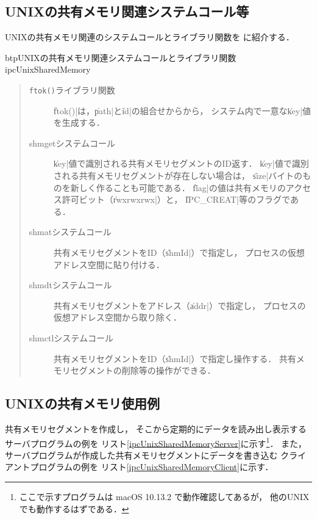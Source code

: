 \subsection{UNIXの共有メモリ関連システムコール等}
UNIXの共有メモリ関連のシステムコールとライブラリ関数を
に紹介する．

\begin{myfig}{btp}{UNIXの共有メモリ関連システムコールとライブラリ関数}
  {ipcUnixSharedMemory}
  
\end{myfig}

\begin{quote}
  \begin{description}
  \item [\texttt{ftok()}ライブラリ関数]
    \|ftok()|は，\|path|と\|id|の組合せからから，
    システム内で一意な\|key|値を生成する．

  \item [shmgetシステムコール]
    \|key|値で識別される共有メモリセグメントのID返す．
    \|key|値で識別される共有メモリセグメントが存在しない場合は，
    \|size|バイトのものを新しく作ることも可能である．
    \|flag|の値は共有メモリのアクセス許可ビット（\|rwxrwxrwx|）と，
    \|IPC_CREAT|等のフラグである．

  \item [shmatシステムコール]
    共有メモリセグメントをID（\|shmId|）で指定し，
    プロセスの仮想アドレス空間に貼り付ける．

  \item [shmdtシステムコール]
    共有メモリセグメントをアドレス（\|addr|）で指定し，
    プロセスの仮想アドレス空間から取り除く．

  \item [shmctlシステムコール]
    共有メモリセグメントをID（\|shmId|）で指定し操作する．
    共有メモリセグメントの削除等の操作ができる．
  \end{description}
\end{quote}

\subsection{UNIXの共有メモリ使用例}
共有メモリセグメントを作成し，
そこから定期的にデータを読み出し表示するサーバプログラムの例を
リスト\ref{ipcUnixSharedMemoryServer}に示す\footnote{
  ここで示すプログラムは macOS 10.13.2 で動作確認してあるが，
  他のUNIXでも動作するはずである．}．
また，サーバプログラムが作成した共有メモリセグメントにデータを書き込む
クライアントプログラムの例を
リスト\ref{ipcUnixSharedMemoryClient}に示す．

